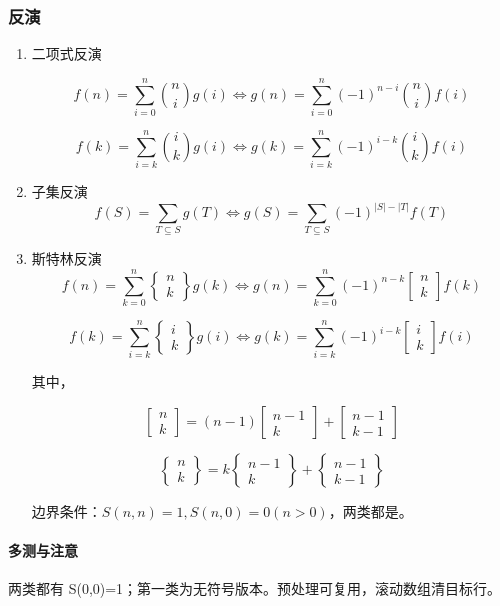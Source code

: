 \subsubsection{反演}
\begin{enumerate}
	\item 二项式反演

	$$f(n) = \sum_{i=0}^{n} \binom{n}{i} g(i) \iff g(n) = \sum_{i=0}^{n} (-1)^{n-i} \binom{n}{i} f(i)$$

$$f(k) = \sum_{i=k}^{n} \binom{i}{k} g(i) \iff g(k) = \sum_{i=k}^{n} (-1)^{i-k} \binom{i}{k} f(i)$$
	\item 子集反演
	$$f(S) = \sum_{T \subseteq S} g(T) \iff g(S) = \sum_{T \subseteq S} (-1)^{|S|-|T|} f(T)$$
	\item 斯特林反演
	$$f(n) = \sum_{k=0}^{n} \begin{Bmatrix} n \\ k \end{Bmatrix} g(k) \iff g(n) = \sum_{k=0}^{n} (-1)^{n-k} \begin{bmatrix} n \\ k \end{bmatrix} f(k)$$

	$$f(k) = \sum_{i=k}^{n} \begin{Bmatrix} i \\ k \end{Bmatrix} g(i) \iff g(k) = \sum_{i=k}^{n} (-1)^{i-k} \begin{bmatrix} i \\ k \end{bmatrix} f(i)$$

	其中，

	$$\begin{bmatrix} n \\ k \end{bmatrix} = (n-1) \begin{bmatrix} n-1 \\ k \end{bmatrix} + \begin{bmatrix} n-1 \\ k-1 \end{bmatrix}$$

	$$\begin{Bmatrix} n \\ k \end{Bmatrix} = k \begin{Bmatrix} n-1 \\ k \end{Bmatrix} + \begin{Bmatrix} n-1 \\ k-1 \end{Bmatrix}$$

	边界条件：$S(n,n)=1,S(n,0)=0(n>0)$，两类都是。
\end{enumerate}

\paragraph{多测与注意} 两类都有 S(0,0)=1；第一类为无符号版本。预处理可复用，滚动数组清目标行。
